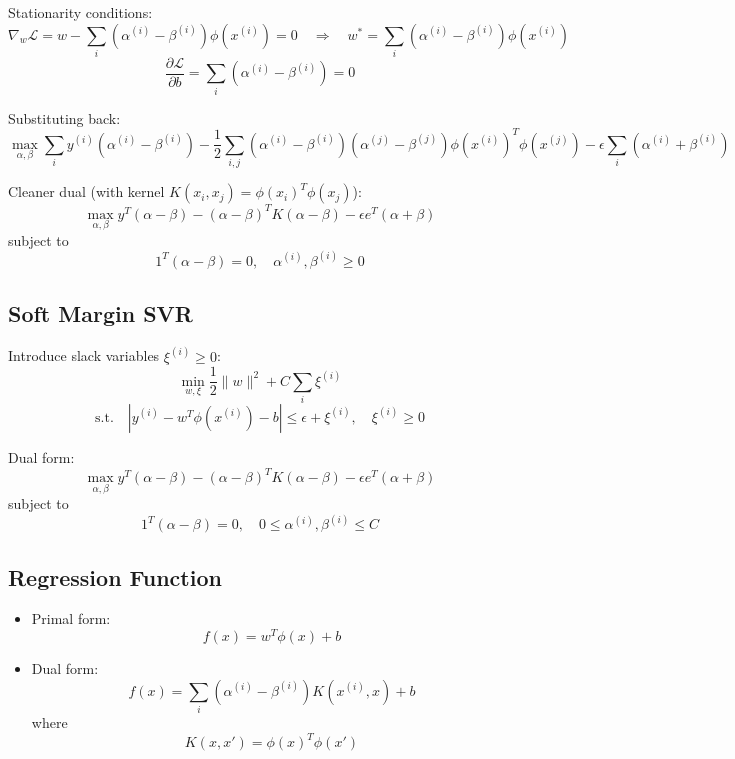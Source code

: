 \documentclass[11pt]{article}
\begin{document}
Stationarity conditions:
\[
\nabla_w \mathcal{L} = w - \sum_i (\alpha^{(i)} - \beta^{(i)})\phi(x^{(i)}) = 0 
\quad \Rightarrow \quad 
w^* = \sum_i (\alpha^{(i)} - \beta^{(i)}) \phi(x^{(i)})
\]
\[
\frac{\partial \mathcal{L}}{\partial b} = \sum_i (\alpha^{(i)} - \beta^{(i)}) = 0
\]

Substituting back:
\[
\max_{\alpha, \beta} \sum_i y^{(i)}(\alpha^{(i)} - \beta^{(i)})
- \frac{1}{2} \sum_{i,j} (\alpha^{(i)} - \beta^{(i)})(\alpha^{(j)} - \beta^{(j)}) 
\phi(x^{(i)})^T \phi(x^{(j)})
- \epsilon \sum_i (\alpha^{(i)} + \beta^{(i)})
\]

Cleaner dual (with kernel $K(x_i, x_j) = \phi(x_i)^T \phi(x_j)$):
\[
\max_{\alpha, \beta} 
y^T (\alpha - \beta) 
- (\alpha - \beta)^T K (\alpha - \beta)
- \epsilon e^T (\alpha + \beta)
\]
subject to
\[
1^T (\alpha - \beta) = 0, \quad \alpha^{(i)}, \beta^{(i)} \geq 0
\]


\subsection*{Soft Margin SVR}
Introduce slack variables $\xi^{(i)} \geq 0$:
\[
\min_{w, \xi} \frac{1}{2}\|w\|^2 + C \sum_i \xi^{(i)}
\]
\[
\text{s.t.} \quad |y^{(i)} - w^T\phi(x^{(i)}) - b| \leq \epsilon + \xi^{(i)}, 
\quad \xi^{(i)} \geq 0
\]

Dual form:
\[
\max_{\alpha, \beta} 
y^T (\alpha - \beta) 
- (\alpha - \beta)^T K (\alpha - \beta) 
- \epsilon e^T (\alpha + \beta)
\]
subject to
\[
1^T (\alpha - \beta) = 0, \quad 0 \leq \alpha^{(i)}, \beta^{(i)} \leq C
\]

\subsection*{Regression Function}
\begin{itemize}
\item Primal form:
\[
f(x) = w^T \phi(x) + b
\]
\item Dual form:
\[
f(x) = \sum_i (\alpha^{(i)} - \beta^{(i)}) K(x^{(i)}, x) + b
\]
where 
\[
K(x, x') = \phi(x)^T \phi(x')
\]
\end{itemize}
\end{document}
